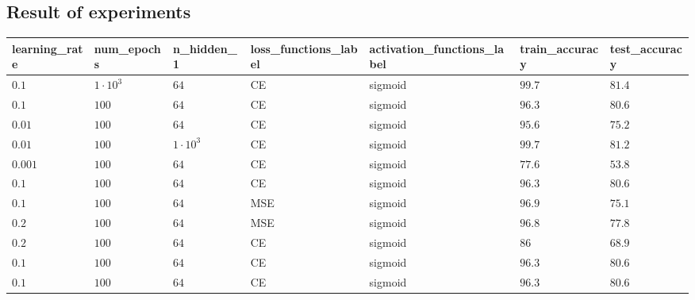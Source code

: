 \documentclass{article}
\begin{document}
\subsection{Result of experiments}
\begin{table}[tbp]
\begin{tabular}{lllllll}
learning\_rate & num\_epochs & n\_hidden\_1 & loss\_functions\_label & activation\_functions\_label & train\_accuracy & test\_accuracy \\ \hline
$0.1$ & $1\cdot 10^{3}$ & $64$ & CE & sigmoid & $99.7$ & $81.4$ \\
$0.1$ & $100$ & $64$ & CE & sigmoid & $96.3$ & $80.6$ \\
$0.01$ & $100$ & $64$ & CE & sigmoid & $95.6$ & $75.2$ \\
$0.01$ & $100$ & $1\cdot 10^{3}$ & CE & sigmoid & $99.7$ & $81.2$ \\
$0.001$ & $100$ & $64$ & CE & sigmoid & $77.6$ & $53.8$ \\
$0.1$ & $100$ & $64$ & CE & sigmoid & $96.3$ & $80.6$ \\
$0.1$ & $100$ & $64$ & MSE & sigmoid & $96.9$ & $75.1$ \\
$0.2$ & $100$ & $64$ & MSE & sigmoid & $96.8$ & $77.8$ \\
$0.2$ & $100$ & $64$ & CE & sigmoid & $86$ & $68.9$ \\
$0.1$ & $100$ & $64$ & CE & sigmoid & $96.3$ & $80.6$ \\
$0.1$ & $100$ & $64$ & CE & sigmoid & $96.3$ & $80.6$ \\
\hline
\end{tabular}
\end{table}
\end{document}

